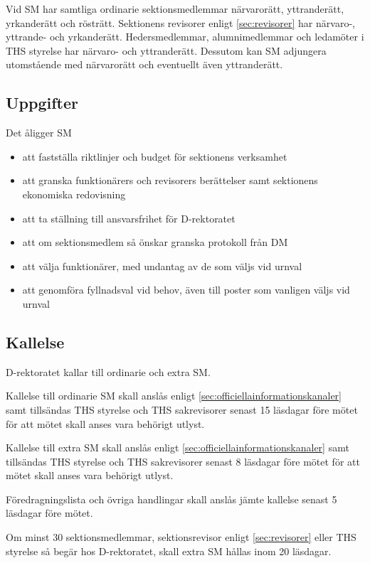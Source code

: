 \documentclass[a4paper,12pt]{article}
\begin{document}
Vid SM har samtliga ordinarie sektionsmedlemmar närvarorätt, yttranderätt, yrkanderätt och rösträtt. Sektionens revisorer enligt \ref{sec:revisorer} har närvaro-, yttrande- och yrkanderätt. Hedersmedlemmar, alumnimedlemmar och ledamöter i THS styrelse har närvaro- och yttranderätt. Dessutom kan SM adjungera utomstående med närvarorätt och eventuellt även yttranderätt.

\subsection{Uppgifter}

Det åligger SM

\begin{itemize}
  \item att fastställa riktlinjer och budget för sektionens verksamhet
  \item att granska funktionärers och revisorers berättelser samt sektionens ekonomiska redovisning
  \item att ta ställning till ansvarsfrihet för D-rektoratet
  \item att om sektionsmedlem så önskar granska protokoll från DM
  \item att välja funktionärer, med undantag av de som väljs vid urnval
  \item att genomföra fyllnadsval vid behov, även till poster som vanligen väljs vid urnval
\end{itemize}

\subsection{Kallelse}

D-rektoratet kallar till ordinarie och extra SM.

Kallelse till ordinarie SM skall anslås enligt \ref{sec:officiellainformationskanaler} samt tillsändas THS styrelse och THS sakrevisorer senast 15 läsdagar före mötet för att mötet skall anses vara behörigt utlyst.

Kallelse till extra SM skall anslås enligt \ref{sec:officiellainformationskanaler} samt tillsändas THS styrelse och THS sakrevisorer senast 8 läsdagar före mötet för att mötet skall anses vara behörigt utlyst.

Föredragningslista och övriga handlingar skall anslås jämte kallelse senast
5 läsdagar före mötet.

Om minst 30 sektionsmedlemmar, sektionsrevisor enligt \ref{sec:revisorer} eller THS styrelse så begär hos D-rektoratet, skall extra SM hållas inom 20 läsdagar.
\end{document}
